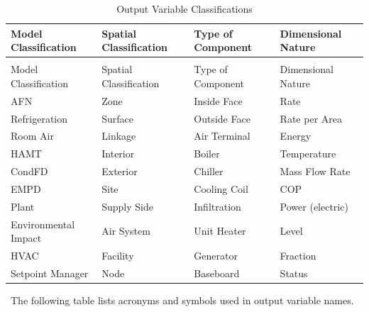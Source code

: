 \begin{longtable}[c]{p{1.5in}p{1.5in}p{1.5in}p{1.5in}}
\caption{Output Variable Classifications \label{table:output-variable-classifications}} \tabularnewline
\toprule 
Model Classification & Spatial Classification & Type of Component & Dimensional Nature \tabularnewline
\midrule
\endfirsthead

\caption[]{Output Variable Classifications} \tabularnewline
\toprule 
Model Classification & Spatial Classification & Type of Component & Dimensional Nature \tabularnewline
\midrule
\endhead

AFN & Zone & Inside Face & Rate \tabularnewline
Refrigeration & Surface & Outside Face & Rate per Area \tabularnewline
Room Air & Linkage & Air Terminal & Energy \tabularnewline
HAMT & Interior & Boiler & Temperature \tabularnewline
CondFD & Exterior & Chiller & Mass Flow Rate \tabularnewline
EMPD & Site & Cooling Coil & COP \tabularnewline
Plant & Supply Side & Infiltration & Power (electric) \tabularnewline
Environmental Impact & Air System & Unit Heater & Level \tabularnewline
HVAC & Facility & Generator & Fraction \tabularnewline
Setpoint Manager & Node & Baseboard & Status \tabularnewline
\bottomrule
\end{longtable}

~The following table lists acronyms and symbols used in output variable names.


